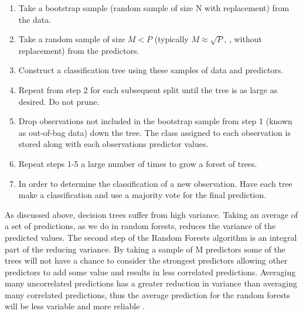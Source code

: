 \documentclass[11pt,a4paper]{article}
\begin{document}
\begin{enumerate}
	\item Take a bootstrap sample (random sample of size N with replacement) from the data. 
	\item Take a random sample of size $M < P$ (typically $M \approx \sqrt{P}$, \cite{james13}, without replacement) from the predictors. 
	\item Construct a classification tree using these samples of data and predictors.
	\item Repeat from step 2 for each subsequent split until the tree is as large as desired. Do not prune. 
	\item Drop observations not included in the bootstrap sample from step 1 (known as out-of-bag data) down the tree. The class assigned to each observation is stored along with each observations predictor values.
	\item Repeat steps 1-5 a large number of times to grow a forest of trees. 
	\item In order to determine the classification of a new observation. Have each tree make a classification and use a majority vote for the final prediction.
\end{enumerate}

As discussed above, decision trees suffer from high variance. Taking an average of a set of predictions, as we do in random forests, reduces the variance of the predicted values. The second step of the Random Forests algorithm is an integral part of the reducing variance. By taking a sample of M predictors some of the trees will not have a chance to consider the strongest predictors allowing other predictors to add some value and results in less correlated predictions. Averaging many uncorrelated predictions has a greater reduction in variance than averaging many correlated predictions, thus the average prediction for the random forests will be less variable and more reliable \citep{james13}.
\end{document}
